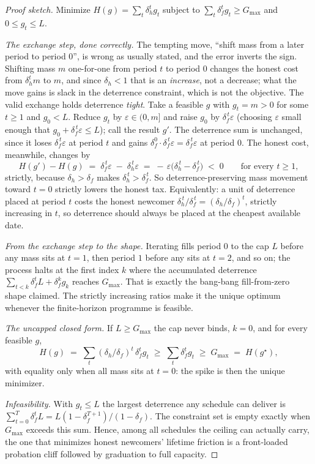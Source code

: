\documentclass[11pt,a4paper]{article}
\theoremstyle{definition}
\begin{document}
\begin{proof}[Proof sketch]
\setlength{\parskip}{4pt plus 1pt}
Minimize $H(g)=\sum_t \delta_h^t g_t$ subject to $\sum_t \delta_f^t g_t\ge G_{\max}$
and $0\le g_t\le L$.

\emph{The exchange step, done correctly.} The tempting move, ``shift mass from a
later period to period $0$'', is wrong as usually stated, and the error inverts
the sign. Shifting mass $m$ one-for-one from period $t$ to
period $0$ changes the honest cost from $\delta_h^t m$ to $m$, and since
$\delta_h<1$ that is an \emph{increase}, not a decrease; what the move gains is
slack in the deterrence constraint, which is not the objective. The valid exchange
holds deterrence \emph{tight}. Take a feasible $g$ with $g_t=m>0$ for some $t\ge 1$
and $g_0<L$. Reduce $g_t$ by $\varepsilon\in(0,m]$ and raise $g_0$ by
$\delta_f^{\,t}\varepsilon$ (choosing $\varepsilon$ small enough that
$g_0+\delta_f^{\,t}\varepsilon\le L$); call the result $g'$. The deterrence sum is
unchanged, since it
loses $\delta_f^{\,t}\varepsilon$ at period $t$ and gains
$\delta_f^{0}\cdot\delta_f^{\,t}\varepsilon=\delta_f^{\,t}\varepsilon$ at period
$0$. The honest cost, meanwhile, changes by
\[
  H(g')-H(g) \;=\; \delta_f^{\,t}\varepsilon \;-\; \delta_h^{\,t}\varepsilon
  \;=\; -\,\varepsilon\bigl(\delta_h^{\,t}-\delta_f^{\,t}\bigr) \;<\; 0
  \qquad\text{for every } t\ge 1,
\]
strictly, because $\delta_h>\delta_f$ makes $\delta_h^{\,t}>\delta_f^{\,t}$. So
deterrence-preserving mass movement toward $t=0$ strictly lowers the honest tax.
Equivalently: a unit of deterrence placed at period $t$ costs the honest newcomer
$\delta_h^{\,t}/\delta_f^{\,t}=(\delta_h/\delta_f)^t$, strictly increasing in $t$,
so deterrence should always be placed at the cheapest available date.

\emph{From the exchange step to the shape.} Iterating fills period $0$ to the cap
$L$ before any mass sits at $t=1$, then period $1$ before any sits at $t=2$, and so
on; the process halts at the first index $k$ where the accumulated deterrence
$\sum_{t<k}\delta_f^t L + \delta_f^k g_k$ reaches $G_{\max}$. That is exactly the
bang-bang fill-from-zero shape claimed. The strictly increasing ratios make it
the unique optimum whenever the finite-horizon programme is feasible.

\emph{The uncapped closed form.} If $L\ge G_{\max}$ the cap never binds, $k=0$, and
for every feasible $g$,
\[
  H(g)\;=\;\sum_t (\delta_h/\delta_f)^t\,\delta_f^t g_t
  \;\ge\;\sum_t \delta_f^t g_t\;\ge\; G_{\max}\;=\;H(g^\star),
\]
with equality only when all mass sits at $t=0$: the spike is then the unique
minimizer.

\emph{Infeasibility.} With $g_t\le L$ the largest deterrence any schedule can
deliver is $\sum_{t=0}^{T}\delta_f^t L=L(1-\delta_f^{T+1})/(1-\delta_f)$.
The constraint set is empty exactly when $G_{\max}$ exceeds this sum. Hence,
among all schedules the ceiling can actually carry, the one that minimizes honest
newcomers' lifetime friction is a front-loaded probation cliff followed by
graduation to full capacity.
\end{proof}
\end{document}
